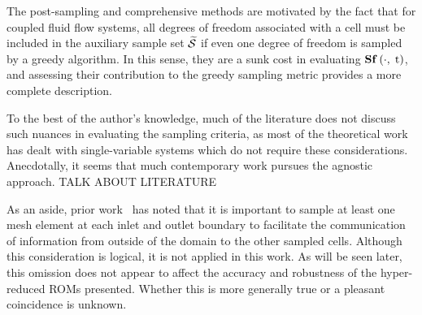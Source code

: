 The post-sampling and comprehensive methods are motivated by the fact that for coupled fluid flow systems, all degrees of freedom associated with a cell must be included in the auxiliary sample set $\mathcal{\widetilde{S}}$ if even one degree of freedom is sampled by a greedy algorithm. In this sense, they are a sunk cost in evaluating $\mathbf{S} \mathbf{f} \left(\cdot, \; \text{t}\right)$, and assessing their contribution to the greedy sampling metric provides a more complete description.

To the best of the author's knowledge, much of the literature does not discuss such nuances in evaluating the sampling criteria, as most of the theoretical work has dealt with single-variable systems which do not require these considerations. Anecdotally, it seems that much contemporary work pursues the agnostic approach. {\color{red}TALK ABOUT LITERATURE}


As an aside, prior work~\cite{Carlberg2013} has noted that it is important to sample at least one mesh element at each inlet and outlet boundary to facilitate the communication of information from outside of the domain to the other sampled cells. Although this consideration is logical, it is not applied in this work. As will be seen later, this omission does not appear to affect the accuracy and robustness of the hyper-reduced ROMs presented. Whether this is more generally true or a pleasant coincidence is unknown.

